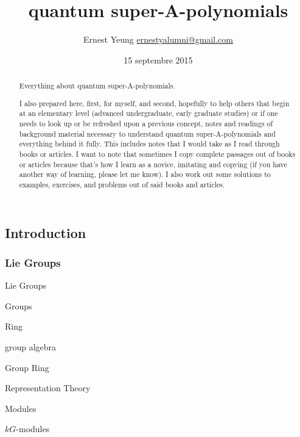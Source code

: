 \documentclass[10pt]{amsart}
\title{quantum super-A-polynomials}
\author{Ernest Yeung \href{mailto:ernestyalumni@gmail.com}{ernestyalumni@gmail.com}}
\date{15 septembre 2015}
\begin{document}

\maketitle

\tableofcontents

\begin{multicols*}{2}

\begin{abstract}
Everything about quantum super-A-polynomials.  

I also prepared here, first, for myself, and second, hopefully to help others that begin at an elementary level (advanced undergraduate, early graduate studies) or if one needs to look up or be refreshed upon a previous concept, notes and readings of background material necessary to understand quantum super-A-polynomials and everything behind it fully.  This includes notes that I would take as I read through books or articles.  I want to note that sometimes I copy complete passages out of books or articles because that's how I learn as a novice, imitating and copying (if you have another way of learning, please let me know).  I also work out some solutions to examples, exercises, and problems out of said books and articles.
\end{abstract}

\part{Introduction}

\section{Lie Groups}

\begin{description}
\item Lie Groups 
\item Groups
\item Ring
\item group algebra
\item Group Ring
\item Representation Theory
\item Modules
\item $kG$-modules
\end{description}


\end{multicols*}
\end{document}
